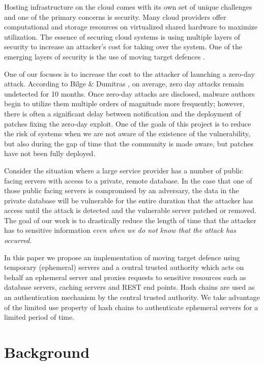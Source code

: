 \documentclass[a4paper,twoside]{article}
\begin{document}
Hosting infrastructure on the cloud comes with its own set of unique challenges and one of the primary concerns is security. Many cloud providers offer computational and storage resources on virtualized shared hardware to maximize utilization. The essence of securing cloud systems is using multiple layers \cite{panwar_layered_2011} of security to increase an attacker's cost for taking over the system. One of the emerging layers of security is the use of moving target defences \cite{evans_effectiveness_2011}.  

One of our focuses is to increase the cost to the attacker of launching a zero-day attack. According to Bilge \& Dumitras \cite{bilge_before_2012}, on average, zero day attacks remain undetected for 10 months. Once zero-day attacks are disclosed, malware authors begin to utilize them multiple orders of magnitude more frequently; however, there is often a significant delay between notification and the deployment of patches fixing the zero-day exploit. One of the goals of this project is to reduce the risk of systems when we are not aware of the existence of the vulnerability, but also during the gap of time that the community is made aware, but patches have not been fully deployed.

Consider the situation where a large service provider has a number of public facing servers with access to a private, remote database.  In the case that one of those public facing servers is compromised by an adversary, the data in the private database will be vulnerable for the entire duration that the attacker has access until the attack is detected and the vulnerable server patched or removed.  The goal of our work is to drastically reduce the length of time that the attacker has to sensitive information \textit{even when we do not know that the attack has occurred}. 

In this paper we propose an implementation of moving target defence using temporary (ephemeral) servers and a central trusted authority which acts on behalf an ephemeral server and proxies requests to sensitive resources such as database servers, caching servers and REST end points. Hash chains are used as an authentication mechanism by the central trusted authority. We take advantage of the limited use property of hash chains to authenticate ephemeral servers for a limited period of time.

\section{Background}
\end{document}
